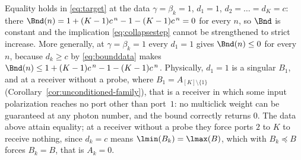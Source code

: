 
\begin{remark}\label{rem:collapsesharp}
Equality holds in \eqref{eq:target} at the data $\gamma=\beta_k=1$,
$d_1=1$, $d_2=\dots=d_K=c$: there $\Bnd(n)=1+(K-1)c^{\,n}-1-(K-1)c^{\,n}=0$ for
every $n$, so $\Bnd$ is constant and the implication
\eqref{eq:collapsestep} cannot be strengthened to strict increase. More
generally, at $\gamma=\beta_k=1$ every $d_1=1$ gives $\Bnd(n)\le0$ for every
$n$, because $d_k\ge c$ by \eqref{eq:bounddata} makes
$\Bnd(n)\le1+(K-1)c^{\,n}-1-(K-1)c^{\,n}$. Physically, $d_1=1$ is a singular
$B_1$, and at a receiver without a probe, where $B_1=A_{[K]\setminus\{1\}}$
(Corollary~\ref{cor:unconditioned-family}), that is a receiver in which some
input polarization reaches no port other than port~$1$: no multiclick weight
can be guaranteed at any photon number, and the bound correctly returns $0$.
The data above attain equality; at a receiver without a probe they force
ports $2$ to $K$ to receive nothing, since $d_k=c$ means
$\lmin(B_k)=\lmax(B)$, which with $B_k\preceq B$ forces $B_k=B$, that is
$A_k=0$.
\end{remark}
